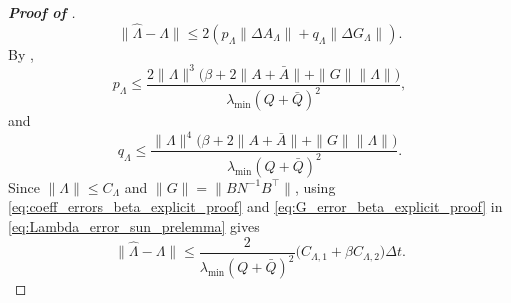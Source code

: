 \documentclass[a4paper, 10pt, english, reqno]{amsart}
\begin{document}
\begin{proof}[\textbf{Proof of }]
\begin{equation}
\label{eq:Lambda_error_sun_prelemma}
  \|\hat\Lambda-\Lambda\|
  \le
  2\left(p_\Lambda\|\Delta A_\Lambda\|+q_\Lambda\|\Delta G_\Lambda\|\right).
\end{equation}
By ,
\[
  p_\Lambda
  \le
  \frac{
    2\|\Lambda\|^3
    \bigl(\beta+2\|A+\bar A\|+\|G\|\|\Lambda\|\bigr)
  }{
    \lambda_{\min}(Q+\bar Q)^2
  },
\]
and
\[
  q_\Lambda
  \le
  \frac{
    \|\Lambda\|^4
    \bigl(\beta+2\|A+\bar A\|+\|G\|\|\Lambda\|\bigr)
  }{
    \lambda_{\min}(Q+\bar Q)^2
  }.
\]
Since $\|\Lambda\|\le C_\Lambda$ and $\|G\|=\|BN^{-1}B^\top\|$, using \eqref{eq:coeff_errors_beta_explicit_proof} and \eqref{eq:G_error_beta_explicit_proof} in \eqref{eq:Lambda_error_sun_prelemma} gives
\begin{equation}
\label{eq:Lambda_error_beta_explicit_proof}
  \|\hat\Lambda-\Lambda\|
  \le
  \frac{2}{\lambda_{\min}(Q+\bar Q)^2}
  \bigl(C_{\Lambda,1}+\beta C_{\Lambda,2}\bigr)\Delta t.
\end{equation}


\end{proof}
\end{document}

